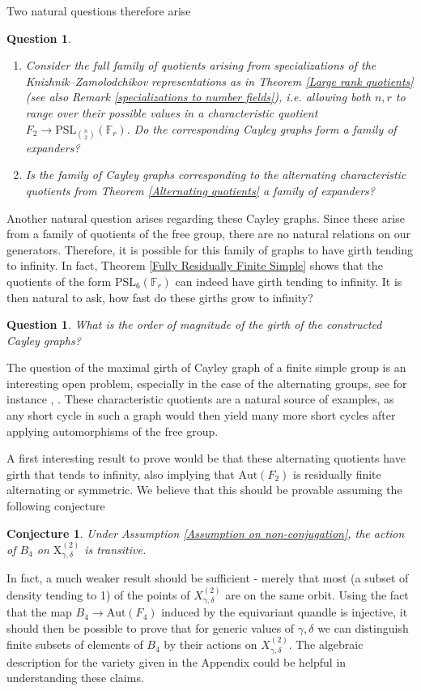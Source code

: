 \documentclass[letterpaper]{amsart}
\newtheorem{question}[theorem]{Question}
\newtheorem{conjecture}[theorem]{Conjecture}
\begin{document}
Two natural questions therefore arise
\begin{question}
\begin{enumerate}
    \item Consider the full family of quotients arising from specializations of the Knizhnik--Zamolodchikov representations as in Theorem \ref{Large rank quotients} (see also Remark \ref{specializations to number fields}), i.e. allowing both $n, r$ to range over their possible values in a characteristic quotient $F_2 \to \mathrm{PSL}_{\binom{n}{2}}(\mathbb{F}_r).$ Do the corresponding Cayley graphs form a family of expanders?
    \item Is the family of Cayley graphs corresponding to the alternating characteristic quotients from Theorem \ref{Alternating quotients} a family of expanders?
\end{enumerate}
\end{question}

Another natural question arises regarding these Cayley graphs. Since these arise from a family of quotients of the free group, there are no natural relations on our generators. Therefore, it is possible for this family of graphs to have girth tending to infinity. In fact, Theorem \ref{Fully Residually Finite Simple} shows that the quotients of the form $\mathrm{PSL}_6(\mathbb{F}_r)$ can indeed have girth tending to infinity.
It is then natural to ask, how fast do these girths grow to infinity?
\begin{question}
What is the order of magnitude of the girth of the constructed Cayley graphs?
\end{question}
The question of the maximal girth of Cayley graph of a finite simple group is an interesting open problem, especially in the case of the alternating groups, see for instance \cite{gamburd2009girth}, \cite{eberhard2017trivial}. These characteristic quotients are a natural source of examples, as any short cycle in such a graph would then yield many more short cycles after applying automorphisms of the free group.

A first interesting result to prove would be that these alternating quotients have girth that tends to infinity, also implying that $\mathrm{Aut}(F_2)$ is residually finite alternating or symmetric. We believe that this should be provable assuming the following conjecture
\begin{conjecture}
\label{Transitive action}
    Under Assumption \ref{Assumption on non-conjugation}, the action of $B_4$ on $\mathrm{X}^{(2)}_{\gamma,\delta}$ is transitive.
\end{conjecture}
In fact, a much weaker result should be sufficient - merely that most (a subset of density tending to 1) of the points of $X_{\gamma,\delta}^{(2)}$ are on the same orbit. Using the fact that the map $B_4 \to \mathrm{Aut}(F_4)$ induced by the equivariant quandle is injective, it should then be possible to prove that for generic values of $\gamma,\delta$ we can distinguish finite subsets of elements of $B_4$ by their actions on $X_{\gamma,\delta}^{(2)}$. The algebraic description for the variety given in the Appendix could be helpful in understanding these claims.
\end{document}
